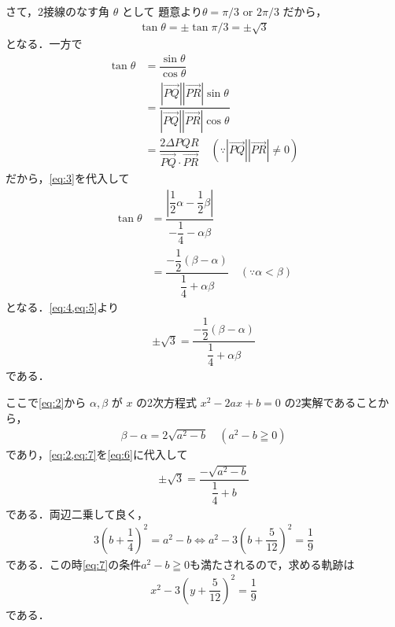 \documentclass[../../main.tex]{subfiles}
\begin{document}
さて，2接線のなす角 $\theta$ として 題意より$\theta = \pi/3$ or $2\pi/3$ だから，
\begin{align}
  \tan\theta = \pm \tan\pi/3 = \pm \sqrt{3} \label{eq:4}
\end{align}
となる．一方で
\begin{align}
  \tan\theta &= \dfrac{\sin\theta}{\cos\theta} \\
  &= \dfrac{|\overrightarrow{PQ}||\overrightarrow{PR}|\sin\theta}{|\overrightarrow{PQ}||\overrightarrow{PR}|\cos\theta} \\
  &= \dfrac{2 \Delta PQR}{\overrightarrow{PQ}\cdot\overrightarrow{PR}} \quad (\because |\overrightarrow{PQ}||\overrightarrow{PR}| \neq 0)
\end{align}
だから，\cref{eq:3}を代入して
\begin{align}
  \tan\theta &= \dfrac{\left|\dfrac{1}{2}\alpha - \dfrac{1}{2}\beta\right|}{-\dfrac{1}{4} - \alpha\beta} \\
  &= \dfrac{-\dfrac{1}{2}(\beta-\alpha)}{\dfrac{1}{4} + \alpha\beta} \quad (\because \alpha<\beta) \label{eq:5}
\end{align}
となる．\cref{eq:4,eq:5}より
\begin{align}
  \pm \sqrt{3} = \dfrac{-\dfrac{1}{2}(\beta-\alpha)}{\dfrac{1}{4} + \alpha\beta} \label{eq:6}
\end{align}
である．

ここで\cref{eq:2}から $\alpha, \beta$ が $x$ の2次方程式 $x^2 - 2ax + b = 0$ の2実解であることから，
\begin{align}
  \beta-\alpha = 2\sqrt{a^2-b} \quad (a^2-b \geqq 0) \label{eq:7}
\end{align}
であり，\cref{eq:2,eq:7}を\cref{eq:6}に代入して
\begin{align}
  \pm \sqrt{3} = \dfrac{-\sqrt{a^2-b}}{\dfrac{1}{4}+b}
\end{align}
である．両辺二乗して良く，
\begin{align}
  3\left(b + \dfrac{1}{4}\right)^2 = a^2 - b
  \iff
  a^2 - 3\left(b + \dfrac{5}{12}\right)^2 = \dfrac{1}{9} \label{eq:8}
\end{align}
である．この時\cref{eq:7}の条件$a^2-b \geqq 0$も満たされるので，求める軌跡は
\begin{align}
  x^2 - 3\left(y + \dfrac{5}{12}\right)^2 = \dfrac{1}{9}
\end{align}
である．
\end{document}
